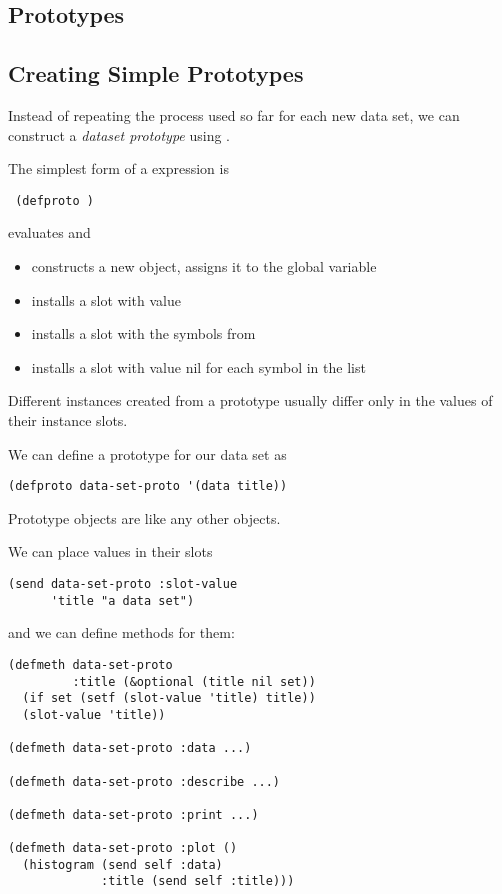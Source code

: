 \begin{slide}{}
\section{Prototypes}
\subsection{Creating Simple Prototypes}
Instead of repeating the process used so far for each new data set, we
can construct a {\em dataset prototype}\/ using .

The simplest form of a  expression is
\begin{flushleft}\Large\tt
(defproto  )
\end{flushleft}
 evaluates  and
\begin{itemize}
\item
constructs a new object, assigns it to the global variable 
\item
installs a slot  with value 
\item
installs a slot  with the symbols from
\item
installs a slot with value nil for each symbol in the
 list
\end{itemize}
Different instances created from a prototype usually differ only in
the values of their instance slots.
\end{slide}

\begin{slide}{}
We can define a prototype for our data set as
{\Large
\begin{verbatim}
(defproto data-set-proto '(data title))
\end{verbatim}}
Prototype objects are like any other objects.

We can place values in their slots
{\Large
\begin{verbatim}
(send data-set-proto :slot-value
      'title "a data set")
\end{verbatim}}
and we can define methods for them:
{\Large
\begin{verbatim}
(defmeth data-set-proto
         :title (&optional (title nil set))
  (if set (setf (slot-value 'title) title))
  (slot-value 'title))

(defmeth data-set-proto :data ...)

(defmeth data-set-proto :describe ...)

(defmeth data-set-proto :print ...)

(defmeth data-set-proto :plot ()
  (histogram (send self :data)
             :title (send self :title)))
\end{verbatim}}
\end{slide}

